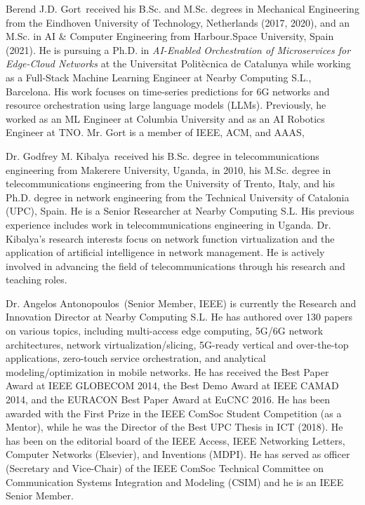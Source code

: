 \documentclass{ieeetmlcn}
\begin{document}
\begin{IEEEbiography}
{Berend J.D. Gort}~received his B.Sc. and M.Sc. degrees in Mechanical Engineering from the Eindhoven University of Technology, Netherlands (2017, 2020), and an M.Sc. in AI \& Computer Engineering from Harbour.Space University, Spain (2021). He is pursuing a Ph.D. in \textit{AI-Enabled Orchestration of Microservices for Edge-Cloud Networks} at the Universitat Politècnica de Catalunya while working as a Full-Stack Machine Learning Engineer at Nearby Computing S.L., Barcelona. His work focuses on time-series predictions for 6G networks and resource orchestration using large language models (LLMs). Previously, he worked as an ML Engineer at Columbia University and as an AI Robotics Engineer at TNO. Mr. Gort is a member of IEEE, ACM, and AAAS,
\end{IEEEbiography}%

\begin{IEEEbiography}
{Dr. Godfrey M. Kibalya}~received his B.Sc. degree in telecommunications engineering from Makerere University, Uganda, in 2010, his M.Sc. degree in telecommunications engineering from the University of Trento, Italy, and his Ph.D. degree in network engineering from the Technical University of Catalonia (UPC), Spain. He is a Senior Researcher at Nearby Computing S.L. His previous experience includes work in telecommunications engineering in Uganda. Dr. Kibalya's research interests focus on network function virtualization and the application of artificial intelligence in network management. He is actively involved in advancing the field of telecommunications through his research and teaching roles.
\end{IEEEbiography}%

\begin{IEEEbiography}
{Dr. Angelos Antonopoulos}~(Senior Member, IEEE) is currently the Research and Innovation Director
at Nearby Computing S.L. He has authored over 130 papers on various topics, including multi-access edge computing, 5G/6G network architectures, network virtualization/slicing, 5G-ready vertical and over-the-top applications, zero-touch service orchestration, and analytical modeling/optimization in mobile networks.
He has received the Best Paper Award at IEEE GLOBECOM 2014, the Best Demo Award at IEEE CAMAD 2014, and the EURACON Best Paper Award at EuCNC 2016. He has been awarded with the First Prize in the IEEE ComSoc Student Competition (as a Mentor), while he was the Director of the Best UPC Thesis in ICT (2018). He has been on the editorial board of the IEEE Access, IEEE Networking Letters, Computer Networks (Elsevier), and Inventions (MDPI). He has served as officer (Secretary and Vice-Chair) of the IEEE ComSoc Technical Committee on Communication Systems Integration and Modeling (CSIM) and he is an IEEE Senior Member.
\end{IEEEbiography}

\vfill\pagebreak


\end{document}
